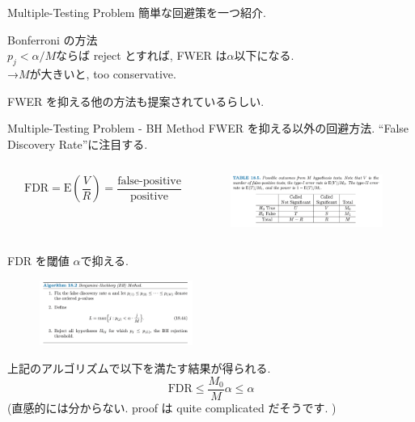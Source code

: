 \documentclass[dvipdfmx,8pt]{beamer}
\begin{document}
  \begin{frame}{Multiple-Testing Problem}
    簡単な回避策を一つ紹介.

    \vspace{\baselineskip}

    Bonferroni の方法\\
    $p_j<\alpha/M$ならば reject とすれば, FWER は$\alpha$以下になる. \\
    →$M$が大きいと, too conservative.

    \vspace{\baselineskip}

    FWER を抑える他の方法も提案されているらしい.
  \end{frame}
  \begin{frame}{Multiple-Testing Problem - BH Method}
    FWER を抑える以外の回避方法. ``False Discovery Rate''に注目する.
    \begin{columns}[T]
      \begin{column}{0.1\columnwidth}

      \end{column}
      \begin{column}{0.3\columnwidth}
        \[
          \mathrm{FDR} = \mathrm{E}\left(\frac{V}{R}\right)=\frac{\mbox{false-positive}}{\mbox{positive}}
        \]
      \end{column}
      \begin{column}{0.6\columnwidth}
        \begin{figure}[htb]
          \centering
          \includegraphics[width=5cm]{./images/confusion-matrix.png}
        \end{figure}
      \end{column}
    \end{columns}
    FDR を閾値 $\alpha$で抑える.
    \begin{figure}[htb]
      \centering
      \includegraphics[width=5cm]{./images/bh-method.png}
    \end{figure}
    上記のアルゴリズムで以下を満たす結果が得られる.
    \[
      \mathrm{FDR}\le\frac{M_0}{M}\alpha\le\alpha
    \]
    (直感的には分からない. proof は quite complicated だそうです. )
  \end{frame}
\end{document}
